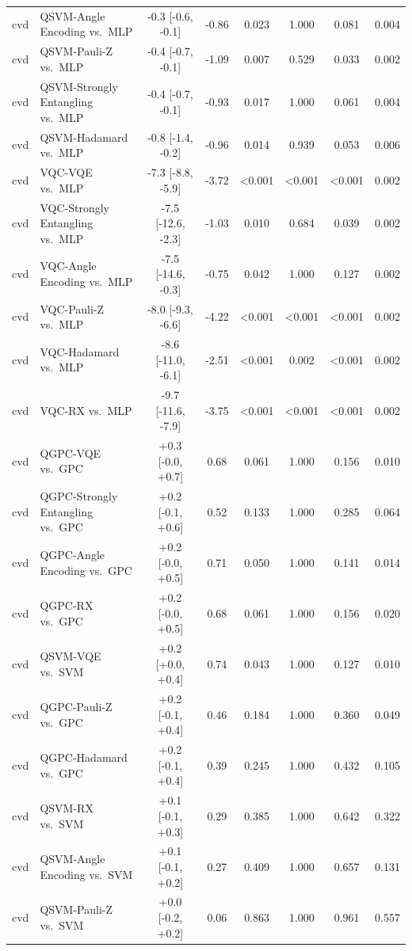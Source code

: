 \begin{tabular}{llcccccc}
cvd & QSVM-Angle Encoding vs.\ MLP & -0.3 [-0.6, -0.1] & -0.86 & 0.023 & 1.000 & 0.081 & 0.004 \\
cvd & QSVM-Pauli-Z vs.\ MLP & -0.4 [-0.7, -0.1] & -1.09 & 0.007 & 0.529 & 0.033 & 0.002 \\
cvd & QSVM-Strongly Entangling vs.\ MLP & -0.4 [-0.7, -0.1] & -0.93 & 0.017 & 1.000 & 0.061 & 0.004 \\
cvd & QSVM-Hadamard vs.\ MLP & -0.8 [-1.4, -0.2] & -0.96 & 0.014 & 0.939 & 0.053 & 0.006 \\
cvd & VQC-VQE vs.\ MLP & -7.3 [-8.8, -5.9] & -3.72 & <0.001 & <0.001 & <0.001 & 0.002 \\
cvd & VQC-Strongly Entangling vs.\ MLP & -7.5 [-12.6, -2.3] & -1.03 & 0.010 & 0.684 & 0.039 & 0.002 \\
cvd & VQC-Angle Encoding vs.\ MLP & -7.5 [-14.6, -0.3] & -0.75 & 0.042 & 1.000 & 0.127 & 0.002 \\
cvd & VQC-Pauli-Z vs.\ MLP & -8.0 [-9.3, -6.6] & -4.22 & <0.001 & <0.001 & <0.001 & 0.002 \\
cvd & VQC-Hadamard vs.\ MLP & -8.6 [-11.0, -6.1] & -2.51 & <0.001 & 0.002 & <0.001 & 0.002 \\
cvd & VQC-RX vs.\ MLP & -9.7 [-11.6, -7.9] & -3.75 & <0.001 & <0.001 & <0.001 & 0.002 \\
cvd & QGPC-VQE vs.\ GPC & +0.3 [-0.0, +0.7] & 0.68 & 0.061 & 1.000 & 0.156 & 0.010 \\
cvd & QGPC-Strongly Entangling vs.\ GPC & +0.2 [-0.1, +0.6] & 0.52 & 0.133 & 1.000 & 0.285 & 0.064 \\
cvd & QGPC-Angle Encoding vs.\ GPC & +0.2 [-0.0, +0.5] & 0.71 & 0.050 & 1.000 & 0.141 & 0.014 \\
cvd & QGPC-RX vs.\ GPC & +0.2 [-0.0, +0.5] & 0.68 & 0.061 & 1.000 & 0.156 & 0.020 \\
cvd & QSVM-VQE vs.\ SVM & +0.2 [+0.0, +0.4] & 0.74 & 0.043 & 1.000 & 0.127 & 0.010 \\
cvd & QGPC-Pauli-Z vs.\ GPC & +0.2 [-0.1, +0.4] & 0.46 & 0.184 & 1.000 & 0.360 & 0.049 \\
cvd & QGPC-Hadamard vs.\ GPC & +0.2 [-0.1, +0.4] & 0.39 & 0.245 & 1.000 & 0.432 & 0.105 \\
cvd & QSVM-RX vs.\ SVM & +0.1 [-0.1, +0.3] & 0.29 & 0.385 & 1.000 & 0.642 & 0.322 \\
cvd & QSVM-Angle Encoding vs.\ SVM & +0.1 [-0.1, +0.2] & 0.27 & 0.409 & 1.000 & 0.657 & 0.131 \\
cvd & QSVM-Pauli-Z vs.\ SVM & +0.0 [-0.2, +0.2] & 0.06 & 0.863 & 1.000 & 0.961 & 0.557 \\

\end{tabular}
